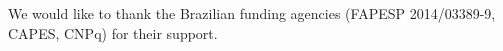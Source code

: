 \begin{acknowledgements}
We would like to thank the Brazilian funding agencies (FAPESP 2014/03389-9, CAPES, CNPq) for their support.
\end{acknowledgements}